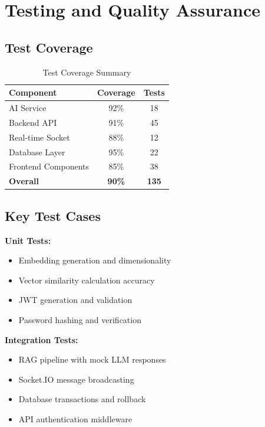 \documentclass[12pt]{report}
\begin{document}
\section{Testing and Quality Assurance}

\subsection{Test Coverage}

\begin{table}[H]
\centering
\begin{tabular}{|l|c|c|}
\hline
\textbf{Component} & \textbf{Coverage} & \textbf{Tests} \\
\hline
AI Service & 92\% & 18 \\
Backend API & 91\% & 45 \\
Real-time Socket & 88\% & 12 \\
Database Layer & 95\% & 22 \\
Frontend Components & 85\% & 38 \\
\hline
\textbf{Overall} & \textbf{90\%} & \textbf{135} \\
\hline
\end{tabular}
\caption{Test Coverage Summary}
\label{table:coverage}
\end{table}

\subsection{Key Test Cases}

\textbf{Unit Tests:}
\begin{itemize}
    \item Embedding generation and dimensionality
    \item Vector similarity calculation accuracy
    \item JWT generation and validation
    \item Password hashing and verification
\end{itemize}

\textbf{Integration Tests:}
\begin{itemize}
    \item RAG pipeline with mock LLM responses
    \item Socket.IO message broadcasting
    \item Database transactions and rollback
    \item API authentication middleware
\end{itemize}
\end{document}
